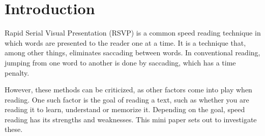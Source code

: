 \section{Introduction}
Rapid Serial Visual Presentation (RSVP) is a common speed reading technique in which words are presented to the reader one at a time. It is a technique that, among other things, eliminates saccading between words. In conventional reading, jumping from one word to another is done by saccading, which has a time penalty.

However, these methods can be criticized, as other factors come into play when reading. One such factor is the goal of reading a text, such as whether you are reading it to learn, understand or memorize it. Depending on the goal, speed reading has its strengths and weaknesses. This mini paper sets out to investigate these.